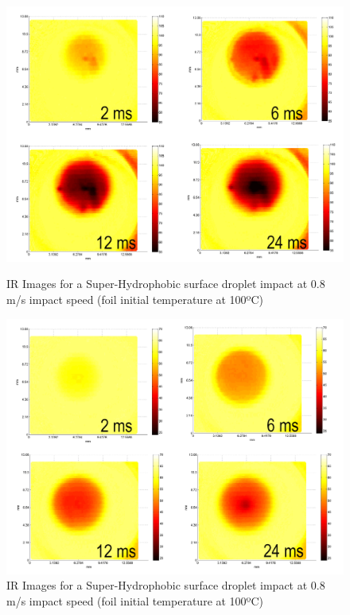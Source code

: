 \begin{figure}[h!]
\centering
\includegraphics[height=0.45\textheight]{Figures/5.Chapter/shfim.png}
\caption{IR Images for a Super-Hydrophobic surface droplet impact at 0.8 m/s impact speed (foil initial temperature at 100ºC)}
\label{fig:shfim}
\includegraphics[height=0.45\textheight]{Figures/5.Chapter/shfim2.png}
\caption{IR Images for a Super-Hydrophobic surface droplet impact at 0.8 m/s impact speed (foil initial temperature at 100ºC)}
\label{fig:shfim2}
\end{figure}

